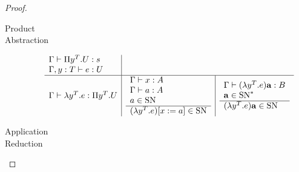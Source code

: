 \documentclass[12pt]{article}
\begin{document}
\begin{theorem}
\begin{proof}
\begin{description}
    \item[Product]

    \item[Abstraction]
      $$
      \begin{array}{l | l | l}
        \Gamma \vdash \Pi y^T.U : s\\
        \Gamma,y:T \vdash e: U \\
        \hline
        \Gamma \vdash \lambda y^T. e : \Pi y^T.U
        & \begin{array}{l} \Gamma \vdash x: A \\
        \Gamma \vdash a : A \\
        a \in \text{SN} \\ \hline (\lambda y^T.e)[x:=a] \in \text{SN}\end{array}
        & \begin{array}{l} \Gamma \vdash (\lambda y^T.e) \mathbf{a} : B \\
        \mathbf{a} \in \text{SN}^* \\ \hline (\lambda y^T.e) \mathbf{a} \in \text{SN}\end{array}
      \end{array}
      $$


    \item[Application]

    \item[Reduction]

    \end{description}

  \end{proof}


\end{theorem}
\end{document}
